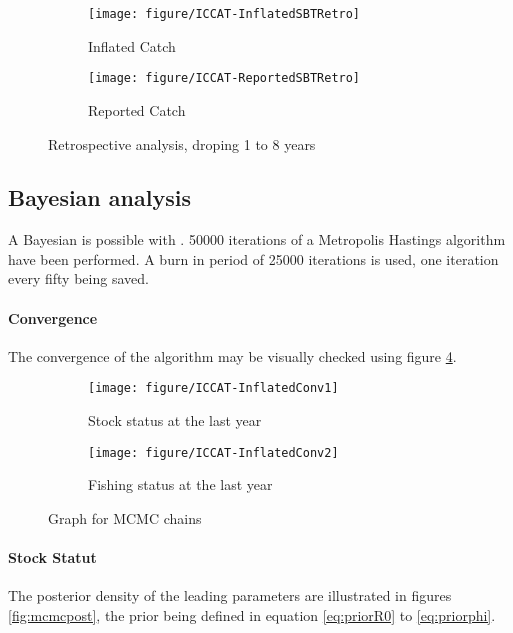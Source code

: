 \begin{figure}[htbp]
 \begin{subfigure}[b]{\textwidth}
  \texttt{[image: figure/ICCAT-InflatedSBTRetro]} 
  \caption{Inflated Catch}
  \end{subfigure}
 \begin{subfigure}[b]{\textwidth}
  \texttt{[image: figure/ICCAT-ReportedSBTRetro]} 
	\caption{Reported Catch}
  \end{subfigure}
\caption{Retrospective analysis, droping 1 to 8 years}
\label{fig:RetroAnalysis}
\end{figure}



\subsection{Bayesian analysis}
A Bayesian is possible with \iscam. 50000 iterations of a Metropolis Hastings algorithm have been performed. 
A burn in period of 25000 iterations is used, one iteration every fifty being saved.  
\paragraph{Convergence}
The convergence of the algorithm may be  visually checked using figure \ref{fig:mcmcdiag}. 

\begin{figure}[htbp]
 \begin{subfigure}[b]{0.45\textwidth}
 \texttt{[image: figure/ICCAT-InflatedConv1]}
  \caption{Stock status at the last year}
                \label{fig:mcmcstock}
  \end{subfigure}
 \begin{subfigure}[b]{0.45\textwidth} 
 \texttt{[image: figure/ICCAT-InflatedConv2]}
\caption{Fishing status at the last year}
                \label{fig:mcmcfish}
  \end{subfigure}
  \caption{Graph for MCMC chains}
  \label{fig:mcmcdiag}
 \end{figure}

\paragraph{Stock Statut}
The posterior density of the leading parameters are illustrated in figures \ref{fig:mcmcpost}, the prior being defined in equation \ref{eq:priorR0} to \ref{eq:priorphi}. 

